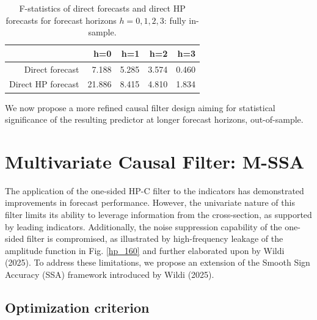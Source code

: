 \documentclass[a4paper]{article}
\begin{document}
\begin{table}[ht]
\centering
\begin{tabular}{rrrrr}
  \hline
 & h=0 & h=1 & h=2 & h=3 \\ 
  \hline
Direct forecast & 7.188 & 5.285 & 3.574 & 0.460 \\ 
  Direct HP forecast & 21.886 & 8.415 & 4.810 & 1.834 \\ 
   \hline
\end{tabular}
\caption{F-statistics of direct forecasts and direct HP forecasts for forecast horizons $h=0,1,2,3$: fully in-sample.  } 
\label{f_stat}
\end{table}We now propose a more refined causal filter design aiming for statistical significance of the resulting predictor at longer forecast horizons, out-of-sample.   




\section{Multivariate Causal Filter: M-SSA}

The application of the one-sided HP-C filter to the indicators has demonstrated improvements in forecast performance. However, the univariate nature of this filter limits its ability to leverage information from the cross-section, as supported by leading indicators. Additionally, the noise suppression capability of the one-sided filter is compromised, as illustrated by high-frequency leakage of the amplitude function in Fig. \eqref{hp_160} and further elaborated upon by Wildi (2025). To address these limitations, we propose an extension of the Smooth Sign Accuracy (SSA) framework introduced by Wildi (2025).


\subsection{Optimization criterion}
\end{document}
